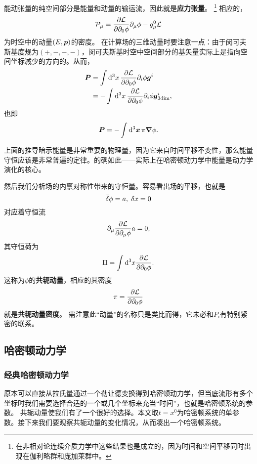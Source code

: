 \documentclass[UTF8, a4paper]{ctexart}
\begin{document}
能动张量的纯空间部分是能量和动量的输运流，因此就是\textbf{应力张量}。%
\footnote{在非相对论连续介质力学中这些结果也是成立的，因为时间和空间平移同时出现在伽利略群和庞加莱群中。}
相应的，
\begin{equation}
    \mathcal{P}_\mu = \pdv{\mathcal{L}}{\partial_0 \phi} \partial_\mu \phi - g_\mu^0 \mathcal{L}
\end{equation}
为时空中的动量$(E, \vb*{p})$的密度。
在计算场的三维动量时要注意一点：由于闵可夫斯基度规为$(+, -, -, -)$，闵可夫斯基时空中空间部分的基矢量实际上是指向空间坐标减少的方向的。从而，
\[
    \begin{aligned}
        \vb*{P} &= \int \dd[3]{x} \pdv{\mathcal{L}}{\partial_0 \phi} \partial_i \phi \vb*{g}^i \\
        &= - \int \dd[3]{x} \pdv{\mathcal{L}}{\partial_0 \phi} \partial_i \phi \vb*{g}^i_{\text{3dim}},
    \end{aligned}
\]
也即
\begin{equation}
    \vb*{P} = - \int \dd[3]{\vb*{x}} \pi \grad{\phi}.
\end{equation}

上面的推导暗示能量是非常重要的物理量，因为它来自时间平移不变性，那么能量守恒应该是非常普遍的定律。的确如此——实际上在哈密顿动力学中能量是动力学演化的核心。

然后我们分析场的内禀对称性带来的守恒量。容易看出场的平移，也就是
\[
    \bar{\var}{\phi} = a, \; \var{x} = 0
\]
对应着守恒流
\[
    \partial_\mu \pdv{\mathcal{L}}{\partial_\mu \phi } a = 0,
\]
其守恒荷为
\begin{equation}
    \Pi = \int \dd[3]x \pdv{\mathcal{L}}{\partial_0 \phi}.
\end{equation}
这称为$\phi$的\textbf{共轭动量}，相应的其密度
\begin{equation}
    \pi = \pdv{\mathcal{L}}{\partial_0 \phi}
    \label{eq:def-pi}
\end{equation}
就是\textbf{共轭动量密度}。
需注意此“动量”的名称只是类比而得，它未必和$P_i$有特别紧密的联系。

\subsection{哈密顿动力学}

\subsubsection{经典哈密顿动力学}
原本可以直接从拉氏量通过一个勒让德变换得到哈密顿动力学，但当底流形有多个坐标时我们需要选择合适的一个或几个坐标来充当“时间”，也就是哈密顿系统的参数。
共轭动量使我们有了一个很好的选择。本文取$t=x^0$为哈密顿系统的单参数。接下来我们要观察共轭动量的变化情况，从而凑出一个哈密顿系统。
\end{document}
